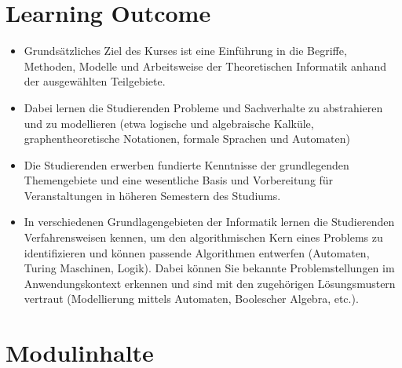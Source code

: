 \hypertarget{learning-outcomepathlabel....srcmodulbeschreibungen-bachelor-bpo5ba_theoretischeinformatik}{%
\section*{Learning
Outcome\label{../../src/modulbeschreibungen-bachelor-bpo5/BA_TheoretischeInformatik}}\label{learning-outcomepathlabel....srcmodulbeschreibungen-bachelor-bpo5ba_theoretischeinformatik}}

\begin{itemize}
\tightlist
\item
  Grundsätzliches Ziel des Kurses ist eine Einführung in die Begriffe,
  Methoden, Modelle und Arbeitsweise der Theoretischen Informatik anhand
  der ausgewählten Teilgebiete.
\item
  Dabei lernen die Studierenden Probleme und Sachverhalte zu
  abstrahieren und zu modellieren (etwa logische und algebraische
  Kalküle, graphentheoretische Notationen, formale Sprachen und
  Automaten)
\item
  Die Studierenden erwerben fundierte Kenntnisse der grundlegenden
  Themengebiete und eine wesentliche Basis und Vorbereitung für
  Veranstaltungen in höheren Semestern des Studiums.
\item
  In verschiedenen Grundlagengebieten der Informatik lernen die
  Studierenden Verfahrensweisen kennen, um den algorithmischen Kern
  eines Problems zu identifizieren und können passende Algorithmen
  entwerfen (Automaten, Turing Maschinen, Logik). Dabei können Sie
  bekannte Problemstellungen im Anwendungskontext erkennen und sind mit
  den zugehörigen Lösungsmustern vertraut (Modellierung mittels
  Automaten, Boolescher Algebra, etc.).
\end{itemize}

\hypertarget{modulinhaltepathlabel....srcmodulbeschreibungen-bachelor-bpo5ba_theoretischeinformatik}{%
\section*{Modulinhalte\label{../../src/modulbeschreibungen-bachelor-bpo5/BA_TheoretischeInformatik}}\label{modulinhaltepathlabel....srcmodulbeschreibungen-bachelor-bpo5ba_theoretischeinformatik}}

